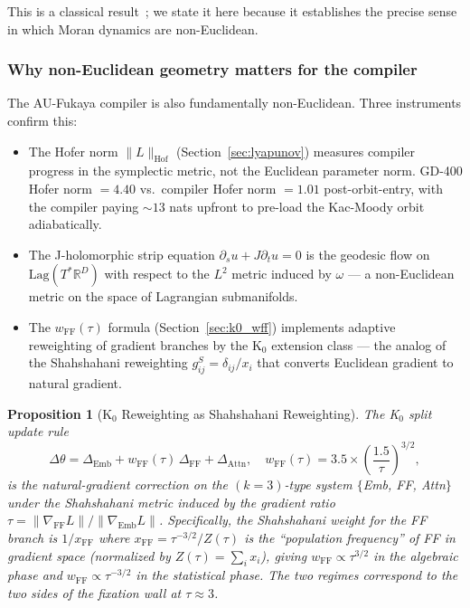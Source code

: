 \documentclass[11pt]{amsart}
\newtheorem{proposition}[theorem]{Proposition}
\begin{document}
This is a classical result~\cite{Akin1979,Hofbauer1988};
we state it here because it establishes the precise sense in which
Moran dynamics are non-Euclidean.

\subsubsection*{Why non-Euclidean geometry matters for the compiler}

The AU-Fukaya compiler is also fundamentally non-Euclidean.
Three instruments confirm this:
\begin{itemize}
\item The Hofer norm $\|L\|_\mathrm{Hof}$ (Section~\ref{sec:lyapunov})
  measures compiler progress in the symplectic metric, not the Euclidean
  parameter norm.
  GD-400 Hofer norm $= 4.40$ vs.\ compiler Hofer norm $= 1.01$
  post-orbit-entry, with the compiler paying $\sim 13$ nats upfront
  to pre-load the Kac-Moody orbit adiabatically.
\item The J-holomorphic strip equation
  $\partial_s u + J\partial_t u = 0$ is the geodesic flow on
  $\mathrm{Lag}(T^*\mathbb{R}^D)$ with respect to the $L^2$ metric
  induced by $\omega$ --- a non-Euclidean metric on the space of
  Lagrangian submanifolds.
\item The $w_\mathrm{FF}(\tau)$ formula (Section~\ref{sec:k0_wff})
  implements adaptive reweighting of gradient branches by the
  K$_0$ extension class --- the analog of the Shahshahani reweighting
  $g_{ij}^S = \delta_{ij}/x_i$ that converts Euclidean gradient
  to natural gradient.
\end{itemize}

\begin{proposition}[K$_0$ Reweighting as Shahshahani Reweighting]
\label{prop:k0_shahshahani}
The K$_0$ split update rule
\[
  \Delta\theta = \Delta_\mathrm{Emb}
               + w_\mathrm{FF}(\tau)\,\Delta_\mathrm{FF}
               + \Delta_\mathrm{Attn},
  \quad w_\mathrm{FF}(\tau) = 3.5 \times \left(\frac{1.5}{\tau}\right)^{3/2},
\]
is the natural-gradient correction on the $(k=3)$-type system
$\{$Emb, FF, Attn$\}$ under the Shahshahani metric induced by
the gradient ratio $\tau = \|\nabla_\mathrm{FF} L\| /
\|\nabla_\mathrm{Emb} L\|$.
Specifically, the Shahshahani weight for the FF branch is
$1/x_\mathrm{FF}$ where $x_\mathrm{FF} = \tau^{-3/2} / Z(\tau)$
is the ``population frequency'' of FF in gradient space
(normalized by $Z(\tau) = \sum_i x_i$),
giving $w_\mathrm{FF} \propto \tau^{3/2}$ in the algebraic phase
and $w_\mathrm{FF} \propto \tau^{-3/2}$ in the statistical phase.
The two regimes correspond to the two sides of the fixation wall
at $\tau \approx 3$.
\end{proposition}
\end{document}
